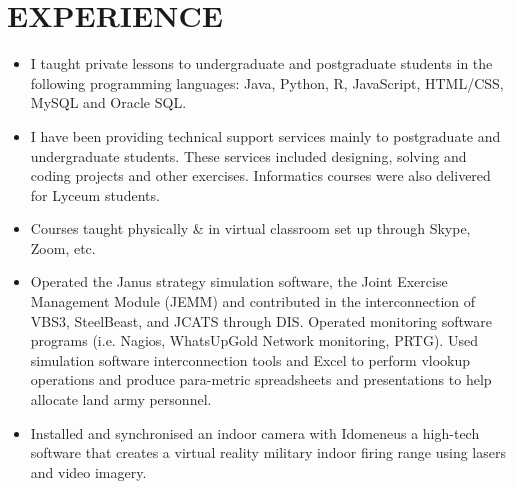 \section{EXPERIENCE}



{
{\begin{flushleft}
\begin{itemize}
  \item I taught private lessons to undergraduate and postgraduate students in the following programming languages: Java, Python, R, JavaScript, HTML/CSS, MySQL and Oracle SQL. 
  \item I have been providing technical support services mainly to postgraduate and undergraduate students. These services included designing, solving and coding projects and other exercises. Informatics courses were also delivered for Lyceum students.  
  \item Courses taught physically \& in virtual classroom set up through Skype, Zoom, etc.
\end{itemize} 
\end{flushleft} } } 

{
{\begin{flushleft}
\begin{itemize}
  \item Operated the Janus strategy simulation software, the Joint Exercise Management Module (JEMM) and contributed in the interconnection of VBS3, SteelBeast, and JCATS through DIS. Operated monitoring software programs (i.e. Nagios, WhatsUpGold Network monitoring, PRTG). Used simulation software interconnection tools and Excel to perform vlookup operations and produce para-metric spreadsheets and presentations to help allocate land army personnel.
  \item Installed and synchronised an indoor camera with Idomeneus a high-tech software that creates a virtual reality military indoor firing range using lasers and video imagery.
\end{itemize} 
\end{flushleft} } } 

